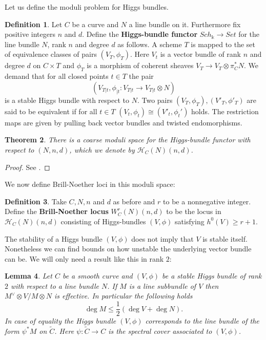 \documentclass[12pt]{extarticle}
\newtheorem{theorem}{Theorem}
\newtheorem{lemma}[theorem]{Lemma}
\theoremstyle{definition}
\newtheorem{definition}[theorem]{Definition}
\numberwithin{theorem}{section}
\newcommand{\cH}{\mathcal{H}}
\renewcommand{\tilde}{\widetilde}		%
\begin{document}
Let us define the moduli problem for Higgs bundles. 
\begin{definition}
Let $C$ be a curve and $N$ a line bundle on it. Furthermore fix positive integers $n$ and $d$. Define the \textbf{Higgs-bundle functor} $Sch_\Bbbk  \rightarrow Set$ for the line bundle $N$, rank $n$ and degree $d$ as follows. A scheme $T$ is mapped to the set of equivalence classes of pairs $(V_T,\phi_T)$. Here $V_t$ is a vector bundle of rank $n$ and degree $d$ on $C \times T$ and $\phi_T$ is a morphism of coherent sheaves $V_T \rightarrow V_T \otimes \pi_C^*N$. We demand that for all closed points  $t \in T$ the pair
\begin{equation*}
(V_{T|t},\phi_{|t}: V_{T|t} \to V_{T|t} \otimes N)
\end{equation*}
is a stable Higgs bundle with respect to $N$.
Two pairs $(V_T,\phi_T),(V'_T,\phi'_T)$ are said to be equivalent if for all $t \in T$ $(V_t,\phi_t) \cong (V'_t,\phi_t')$ holds. The restriction maps are given by pulling back vector bundles and twisted endomorphisms.
\end{definition}
\begin{theorem}
There is a coarse moduli space for the Higgs-bundle functor with respect to $(N,n,d)$, which we denote by $\cH_C(N)(n,d)$.
\end{theorem}
\begin{proof}
See \cite[Theorem 5.10]{Nitsure}.
\end{proof}
We now define Brill-Noether loci in this moduli space:
\begin{definition}
Take $C, N, n$ and $d$ as before and $r$ to be a  nonnegative integer. Define the \textbf{Brill-Noether locus} $W^r_C(N)(n,d)$ to be the locus in $\mathcal{H}_C(N)(n,d)$ consisting of Higgs-bundles $(V,\phi)$ satisfying $h^0(V) \geq r +1$.
\end{definition}
The stability of a Higgs bundle $(V,\phi)$ does not imply that $V$ is stable itself. Nonetheless we can find bounds on how unstable the underlying vector bundle can be. We will only need a result like this in rank $2$:
\begin{lemma}\label{lemma:max_subbundle}
Let $C$ be a smooth curve and $(V,\phi)$ be a stable Higgs bundle of rank $2$ with respect to a line bundle $N$. If $M$ is a line subbundle of $V$ then $M^\vee \otimes V/M \otimes N$ is effective. In particular the following holds 
\begin{equation}\label{eq:max_subbundle}
\deg M \leq \frac{1}{2}\left(\deg V + \deg N\right).
\end{equation} 
In case of equality the Higgs bundle $(V,\phi)$ corresponds to the line bundle of the form $\psi^*M$ on $\tilde{C}$. Here $\psi : \tilde{C} \rightarrow C$ is the spectral cover associated to $(V,\phi)$.
\end{lemma} 
\end{document}
